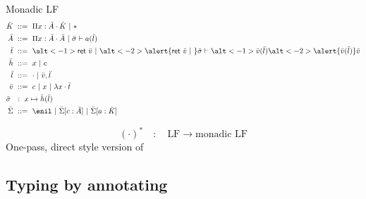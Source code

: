 \documentclass[ignorenonframetext,red]{beamer}
\begin{document}
\begin{frame}{Monadic LF}
  \inXLF
  \begin{align*}
    \mk &\gequal \prd\mv\mf\mk \gor \type \\
    \mf &\gequal \prd\mv\mf\mf \gor \sapply\ms{\lapp\mcf\ma} \\
    \mo &\gequal \alt<-1>{\ret\mval\gor}{\alt<-2>{\alert{\ret\mval
          \gor}}{}} \sapply\ms{\alt<-1>{\lapp\mval\ma}{\alt<-2>{\alert{\lapp\mval\ma}}{\mval}}} \\
    \mh &\gequal \mv \gor \mco \\
    \ma &\gequal \lnil \gor \lcons\mval\ma \\
    \mval &\gequal \mco \gor \mv \gor \ulam\mv\mo \\
    \ms\ &\ :\ \mv\mapsto{\lapp\mh\ma} \\
    \msi &\gequal { \enil \gor \ebinddecl\msi\mco\mf \gor
      \ebinddecl\msi\mcf\mk }
  \end{align*}
  \pause\pause\pause
 \begin{definition}
    $$ (\cdot)^* \quad:\quad \text{LF} \to \text{monadic LF} $$
    One-pass, direct style version of 
 \end{definition}
\end{frame}

\subsection{Typing by annotating}
\end{document}
